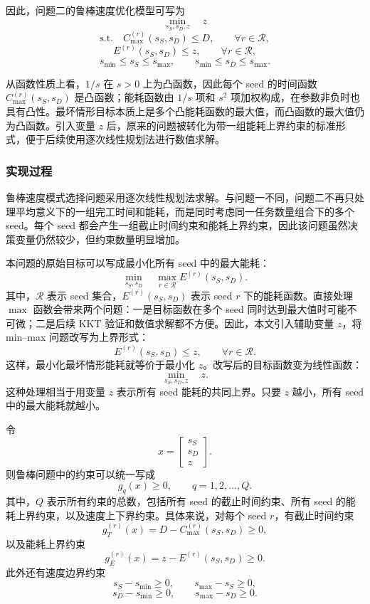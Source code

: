 因此，问题二的鲁棒速度优化模型可写为
\[
\min_{s_S,s_D,z}
\quad
z
\]
\[
\mathrm{s.t.}\quad
C_{\max}^{(r)}(s_S,s_D)\leq D,
\qquad
\forall r\in\mathcal{R},
\]
\[
E^{(r)}(s_S,s_D)\leq z,
\qquad
\forall r\in\mathcal{R},
\]
\[
s_{\min}\leq s_S\leq s_{\max},
\qquad
s_{\min}\leq s_D\leq s_{\max}.
\]

从函数性质上看，$1/s$ 在 $s>0$ 上为凸函数，因此每个 seed 的时间函数 $C_{\max}^{(r)}(s_S,s_D)$ 是凸函数；能耗函数由 $1/s$ 项和 $s^2$ 项加权构成，在参数非负时也具有凸性。最坏情形目标本质上是多个凸能耗函数的最大值，而凸函数的最大值仍为凸函数。引入变量 $z$ 后，原来的问题被转化为带一组能耗上界约束的标准形式，便于后续使用逐次线性规划法进行数值求解。


\subsubsection{实现过程}

鲁棒速度模式选择问题采用逐次线性规划法求解。与问题一不同，问题二不再只处理平均意义下的一组完工时间和能耗，而是同时考虑同一任务数量组合下的多个 seed。每个 seed 都会产生一组截止时间约束和能耗上界约束，因此该问题虽然决策变量仍然较少，但约束数量明显增加。

本问题的原始目标可以写成最小化所有 seed 中的最大能耗：
\[
\min_{s_S,s_D}
\quad
\max_{r\in\mathcal{R}} E^{(r)}(s_S,s_D).
\]
其中，$\mathcal{R}$ 表示 seed 集合，$E^{(r)}(s_S,s_D)$ 表示 seed $r$ 下的能耗函数。直接处理 $\max$ 函数会带来两个问题：一是目标函数在多个 seed 同时达到最大值时可能不可微；二是后续 KKT 验证和数值求解都不方便。因此，本文引入辅助变量 $z$，将 min--max 问题改写为上界形式：
\[
E^{(r)}(s_S,s_D)\leq z,
\qquad
\forall r\in\mathcal{R}.
\]
这样，最小化最坏情形能耗就等价于最小化 $z$。改写后的目标函数变为线性函数：
\[
\min_{s_S,s_D,z}\quad z.
\]
这种处理相当于用变量 $z$ 表示所有 seed 能耗的共同上界。只要 $z$ 越小，所有 seed 中的最大能耗就越小。

令
\[
x
=
\begin{bmatrix}
	s_S\\
	s_D\\
	z
\end{bmatrix}.
\]
则鲁棒问题中的约束可以统一写成
\[
g_q(x)\geq 0,
\qquad q=1,2,\ldots,Q.
\]
其中，$Q$ 表示所有约束的总数，包括所有 seed 的截止时间约束、所有 seed 的能耗上界约束，以及速度上下界约束。具体来说，对每个 seed $r$，有截止时间约束
\[
g_T^{(r)}(x)
=
D-C_{\max}^{(r)}(s_S,s_D)
\geq 0,
\]
以及能耗上界约束
\[
g_E^{(r)}(x)
=
z-E^{(r)}(s_S,s_D)
\geq 0.
\]
此外还有速度边界约束
\[
s_S-s_{\min}\geq 0,
\qquad
s_{\max}-s_S\geq 0,
\]
\[
s_D-s_{\min}\geq 0,
\qquad
s_{\max}-s_D\geq 0.
\]

